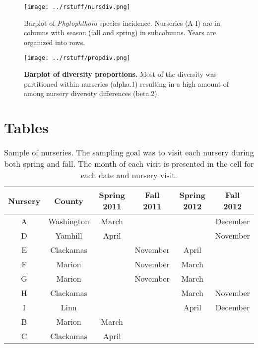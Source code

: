 \documentclass[12pt]{article}
\begin{document}
\begin{figure}[!ht]
\begin{center}
\texttt{[image: ../rstuff/nursdiv.png]}
\end{center}
\caption{
Barplot of \emph{Phytophthora} species incidence.  Nurseries (A-I) are in columns with season (fall and spring) in subcolumns.  Years are organized into rows.
}
\label{fig:nursdiv}
\end{figure}
\clearpage

\begin{figure}[!ht]
\begin{center}
\texttt{[image: ../rstuff/propdiv.png]}
\end{center}
\caption{
{\bf Barplot of diversity proportions.} Most of the diversity was partitioned within nurseries (alpha.1) resulting in a high amount of among nursery diversity differences (beta.2).
}
\label{fig:propdiv}
\end{figure}
\clearpage

\section*{Tables}

\begin{table}[!ht]
\caption{Sample of nurseries.  The sampling goal was to visit each nursery during both spring and fall.  The month of each visit is presented in the cell for each date and nursery visit.}
\begin{tabular}{cccccc}
\hline
\textbf{Nursery} & \textbf{County} & \textbf{Spring 2011} & \textbf{Fall 2011} & \textbf{Spring 2012} & \textbf{Fall 2012} \\
\hline
A & Washington & March & & & December \\
D & Yamhill & April & & & November \\
E & Clackamas & & November & April & \\
F & Marion & & November & March & \\
G & Marion & & November & March & \\
H & Clackamas & & & March & November \\
I & Linn & & & April & December \\
B & Marion & March & & & \\
C & Clackamas & April & & & \\
\hline
\end{tabular}
\label{tab:sample}
\end{table}
\end{document}
